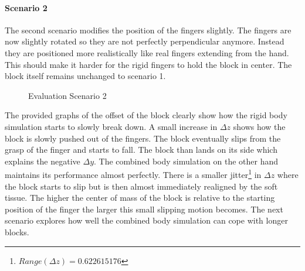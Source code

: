 \clearpage
\paragraph{Scenario 2}
The second scenario modifies the position of the fingers slightly. The fingers are now slightly rotated so they are not perfectly perpendicular anymore. Instead they are positioned more realistically like real fingers extending from the hand. This should make it harder for the rigid fingers to hold the block in center. The block itself remains unchanged to scenario 1.

\begin{figure}[htb]
	\setcounter{subfigure}{0}
	\centering
	\setcounter{subfigure}{0}
	\caption{Evaluation Scenario 2}
\end{figure}

The provided graphs of the offset of the block clearly show how the rigid body simulation starts to slowly break down. A small increase in $\Delta z$ shows how the block is slowly pushed out of the fingers. The block eventually slips from the grasp of the finger and starts to fall. The block than lands on its side which explains the negative $\Delta y$. The combined body simulation on the other hand maintains its performance almost perfectly. There is a smaller jitter\footnote{$Range(\Delta z)=0.622615176$} in $\Delta z$ where the block starts to slip but is then almost immediately realigned by the soft tissue. The higher the center of mass of the block is relative to the starting position of the finger the larger this small slipping motion becomes. The next scenario explores how well the combined body simulation can cope with longer blocks.


